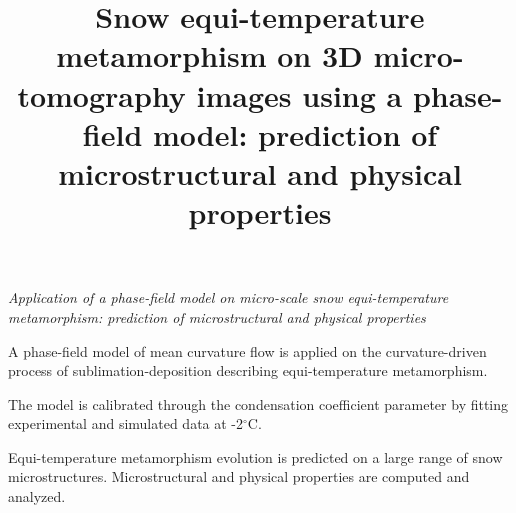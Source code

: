 \documentclass[draft,ms]{agujournal2019}
\begin{document}
\title{Snow equi-temperature metamorphism on 3D micro-tomography images using a phase-field model: prediction of microstructural and physical properties}
\textit{Application of a phase-field model on micro-scale snow equi-temperature metamorphism: prediction of microstructural and physical properties}





\begin{keypoints}
\item A phase-field model of mean curvature flow is applied on the curvature-driven process of sublimation-deposition describing equi-temperature metamorphism.%
\item The model is calibrated through the condensation coefficient parameter by fitting experimental and simulated data at -2$^\circ$C.
\item Equi-temperature metamorphism evolution is predicted on a large range of snow microstructures. Microstructural and physical properties are computed and analyzed.
\end{keypoints}
\end{document}

